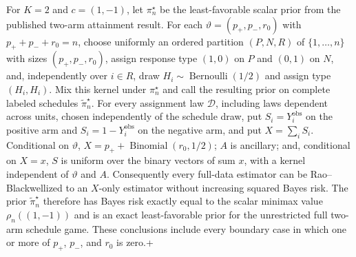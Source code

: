 For \(K=2\) and \(c=(1,-1)\), let \(\pi_n^\star\) be the least-favorable scalar prior from the published two-arm attainment result. For each \(\vartheta=(p_+,p_-,r_0)\) with \(p_++p_-+r_0=n\), choose uniformly an ordered partition \((P,N,R)\) of \(\{1,\ldots,n\}\) with sizes \((p_+,p_-,r_0)\), assign response type \((1,0)\) on \(P\) and \((0,1)\) on \(N\), and, independently over \(i\in R\), draw \(H_i\sim\operatorname{Bernoulli}(1/2)\) and assign type \((H_i,H_i)\). Mix this kernel under \(\pi_n^\star\) and call the resulting prior on complete labeled schedules \(\widetilde\pi_n^\star\). For every assignment law \(\mathcal D\), including laws dependent across units, chosen independently of the schedule draw, put \(S_i=Y_i^{\mathrm{obs}}\) on the positive arm and \(S_i=1-Y_i^{\mathrm{obs}}\) on the negative arm, and put \(X=\sum_iS_i\). Conditional on \(\vartheta\), \(X=p_++\operatorname{Binomial}(r_0,1/2)\); \(A\) is ancillary; and, conditional on \(X=x\), \(S\) is uniform over the binary vectors of sum \(x\), with a kernel independent of \(\vartheta\) and \(A\). Consequently every full-data estimator can be Rao--Blackwellized to an \(X\)-only estimator without increasing squared Bayes risk. The prior \(\widetilde\pi_n^\star\) therefore has Bayes risk exactly equal to the scalar minimax value \(\rho_n((1,-1))\) and is an exact least-favorable prior for the unrestricted full two-arm schedule game. These conclusions include every boundary case in which one or more of \(p_+\), \(p_-\), and \(r_0\) is zero.+